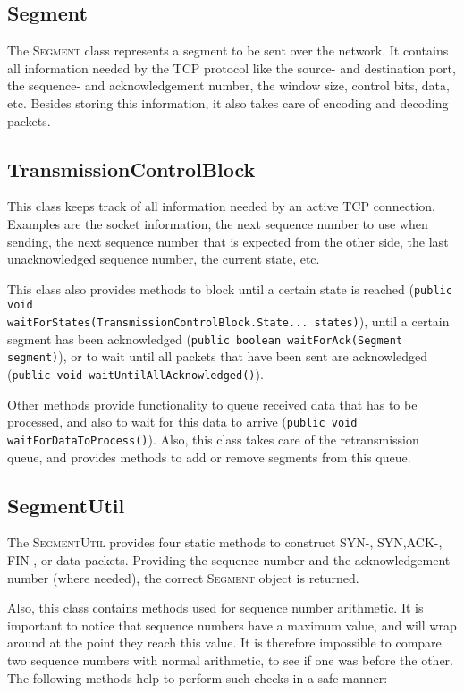 \documentclass{hitec}
\newcommand{\classname}[1]{\textsc{#1}}
\newcommand{\methodname}[1]{\texttt{#1}}
\begin{document}
\subsection{Segment}
The \classname{Segment} class represents a segment to be sent over the network. It contains all information needed by the TCP protocol like the source- and destination port, the sequence- and acknowledgement number, the window size, control bits, data, etc. Besides storing this information, it also takes care of encoding and decoding packets.

\subsection{TransmissionControlBlock}
This class keeps track of all information needed by an active TCP connection. Examples are the socket information, the next sequence number to use when sending, the next sequence number that is expected from the other side, the last unacknowledged sequence number, the current state, etc.

This class also provides methods to block until a certain state is reached (\methodname{public void \\ waitForStates(TransmissionControlBlock.State... states)}), until a certain segment has been acknowledged (\methodname{public boolean waitForAck(Segment segment)}), or to wait until all packets that have been sent are acknowledged (\methodname{public void waitUntilAllAcknowledged()}).

Other methods provide functionality to queue received data that has to be processed, and also to wait for this data to arrive (\methodname{public void waitForDataToProcess()}). Also, this class takes care of the retransmission queue, and provides methods to add or remove segments from this queue.

\subsection{SegmentUtil}
The \classname{SegmentUtil} provides four static methods to construct SYN-, SYN,ACK-, FIN-, or data-packets. Providing the sequence number and the acknowledgement number (where needed), the correct \classname{Segment} object is returned. 

Also, this class contains methods used for sequence number arithmetic. It is important to notice that sequence numbers have a maximum value, and will wrap around at the point they reach this value. It is therefore impossible to compare two sequence numbers with normal arithmetic, to see if one was before the other. The following methods help to perform such checks in a safe manner:
\end{document}
